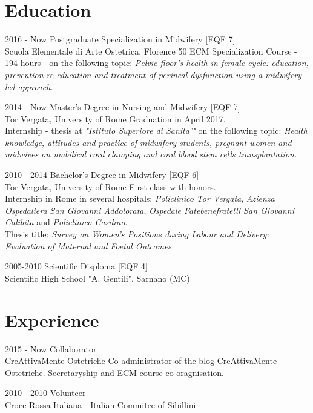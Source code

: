 \documentclass[11pt, print]{friggeri-cv}
\begin{document}
\section{Education}
\begin{entrylist}
	\entry
	{2016 - Now}
	{Postgraduate Specialization in Midwifery [\small EQF 7]}
	{\\Scuola Elementale di Arte Ostetrica, Florence}
	{50 ECM Specialization Course - 194 hours - on the following topic: \emph{Pelvic floor's health in female cycle: education, prevention re-education and treatment of perineal dysfunction using a midwifery-led approach.}\\}
	
	\entry
	{2014 - Now}
	{Master's Degree in Nursing and Midwifery [\small EQF 7]}
	{\\Tor Vergata, University of Rome}
	{Graduation in April 2017. \\Internship - thesis at \textit{"Istituto Superiore di Sanita'"} on the following topic: \textit{Health knowledge, attitudes and practice of midwifery students, pregnant women and midwives on umbilical cord clamping and cord blood stem cells transplantation.}\\}
	
	\entry
	{2010 - 2014}
	{Bachelor's Degree in Midwifery [\small EQF 6]}
	{\\Tor Vergata, University of Rome}
	{First class with honors.\\
	Internship in Rome in several hospitals: \textit{Policlinico Tor Vergata}, \textit{Azienza Ospedaliera San Giovanni Addolorata}, \textit{Ospedale Fatebenefratelli San Giovanni Calibita} and \textit{Policlinico Casilino}.\\
	Thesis title: \textit{Survey on Women's Positions during Labour and Delivery: Evaluation of Maternal and Foetal Outcomes.}\\}

	\entry
	{2005-2010}
	{Scientific Disploma [\small EQF 4]}
	{\\Scientific High School "A. Gentili", Sarnano (MC)}
	{}
\end{entrylist}

\section{Experience}
\begin{entrylist}
  \entry
  {2015 - Now}
  {Collaborator}
  {\\CreAttivaMente Ostetriche}
  {Co-administrator of the blog \href{http://creattivamenteostetriche2012.blogspot.it/}{CreAttivaMente Ostetriche}. 
  	Secretaryship and ECM-course co-oragnisation.\\}
  
  \entry
    {2010 - 2010}
    {Volunteer}
    {\\Croce Rossa Italiana - Italian Commitee of Sibillini}
    {\\}
\end{entrylist}
\end{document}
